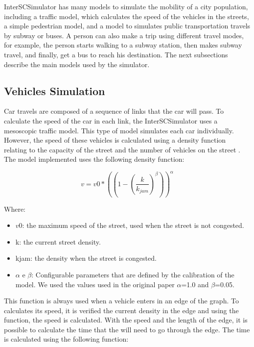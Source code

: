 InterSCSimulator has many models to simulate the mobility of a city population, including a traffic model, which calculates the speed of the vehicles in the streets, a simple pedestrian model, and a model to simulates public transportation travels by subway or buses. A person can also make a trip using different travel modes, for example, the person starts walking to a subway station, then makes subway travel, and finally, get a bus to reach his destination. The next subsections describe the main models used by the simulator.

\subsection{Vehicles Simulation}

Car travels are composed of a sequence of links that the car will pass. To calculate the speed of the car in each link, the InterSCSimulator uses a mesoscopic traffic model. This type of model simulates each car individually. However, the speed of these vehicles is calculated using a density function relating to the capacity of the street and the number of vehicles on the street \cite{song2017gpusimulation}. The model implemented uses the following density function:

\[
v=v0*(( 1 - ( \frac{k}{k_{jam}} ) ^ \beta ) ) ^ \alpha
\]

Where:

\begin{itemize}

\item $v0$: the maximum speed of the street, used when the street is not congested.
\item k: the current street density.
\item kjam: the density when the street is congested.
\item $\alpha$ e $\beta$: Configurable parameters that are defined by the calibration of the model. We used the values used in the original paper $\alpha$=1.0 and $\beta$=0.05. 

\end{itemize}

This function is always used when a vehicle enters in an edge of the graph. To calculates its speed, it is verified the current density in the edge and using the function, the speed is calculated. With the speed and the length of the edge, it is possible to calculate the time that the will need to go through the edge. The time is calculated using the following function:

